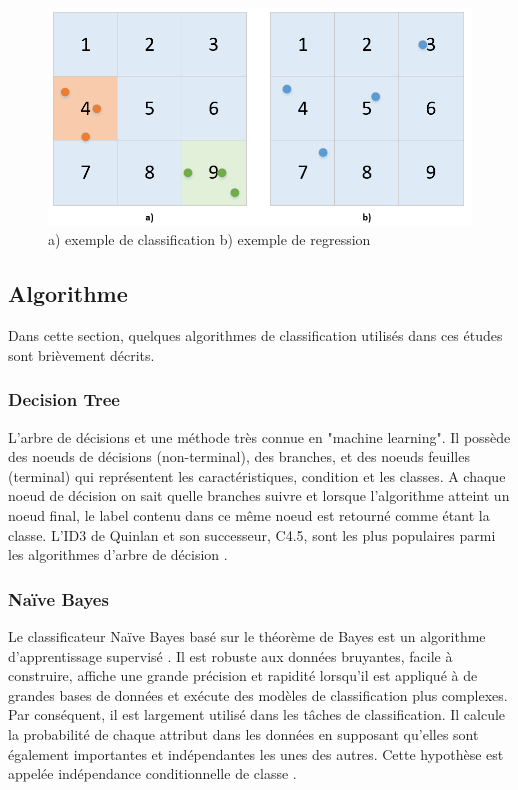 \begin{figure}[htp]
	\begin{center}
		\includegraphics[scale=0.5]{figures/ClassReg.png}
		\caption{a) exemple de classification  b) exemple de regression}
		\label{fig:ClassReg} %
	\end{center}
\end{figure}

\subsection{Algorithme}
Dans cette section, quelques algorithmes de classification utilisés dans ces études \cite{ML_indoor} \cite{ML_UWB} \cite{CP_RSS} sont brièvement décrits.

\subsubsection{Decision Tree}
L'arbre de décisions et une méthode très connue en "machine learning". Il possède des noeuds de décisions (non-terminal), des branches, et des noeuds feuilles (terminal) qui représentent les caractéristiques, condition et les classes. A chaque noeud de décision on sait quelle branches suivre et lorsque l'algorithme atteint un noeud final, le label contenu dans ce même noeud est retourné comme étant la classe. 
L’ID3 de Quinlan et son successeur, C4.5, sont les plus populaires parmi les algorithmes d’arbre de décision \cite{C4_5}.

\subsubsection{Naïve Bayes}
Le classificateur Naïve Bayes \cite{Bayesian} basé sur le théorème de Bayes est un algorithme d'apprentissage supervisé \cite{DefectPred}. Il est robuste aux données bruyantes, facile à construire, affiche une grande précision et rapidité lorsqu'il est appliqué à de grandes bases de données et exécute des modèles de classification plus complexes. Par conséquent, il est largement utilisé dans les tâches de classification. Il calcule la probabilité de chaque attribut dans les données en supposant qu'elles sont également importantes et indépendantes les unes des autres. Cette hypothèse est appelée indépendance conditionnelle de classe \cite{KMean_DT} \cite{QUAIL}.

